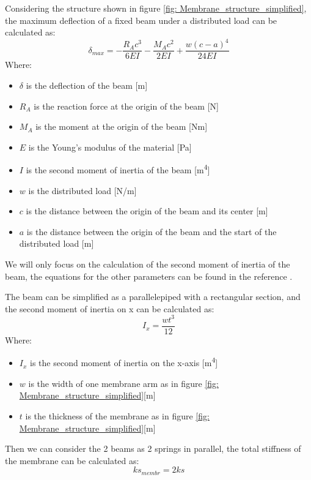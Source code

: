 Considering the structure shown in figure \ref{fig: Membrane_structure_simplified}, the maximum deflection of a fixed beam under a distributed load can be calculated as:
\begin{equation}
    \label{eq: Beam_deflection}
    \delta_{max} = -\frac{R_A c^3}{6 E I} - \frac{M_A c^2}{2EI} + \frac{w (c-a)^4}{24 EI}
\end{equation}
Where:
\begin{itemize}
    \item $\delta$ is the deflection of the beam [m]
    \item $R_A$ is the reaction force at the origin of the beam [N]
    \item $M_A$ is the moment at the origin of the beam [Nm]
    \item $E$ is the Young's modulus of the material [Pa]
    \item $I$ is the second moment of inertia of the beam [m\textsuperscript{4}]
    \item $w$ is the distributed load [N/m]
    \item $c$ is the distance between the origin of the beam and its center [m]
    \item $a$ is the distance between the origin of the beam and the start of the distributed load [m]
\end{itemize}
We will only focus on the calculation of the second moment of inertia of the beam, the equations for the other parameters can be found in the reference \cite{statics_fixed_beam}.

The beam can be simplified as a parallelepiped with a rectangular section, and the second moment of inertia on x can be calculated as:
\begin{equation}
    \label{eq: Beam_inertia}
    I_x = \frac{w t^3}{12}
\end{equation}
Where:
\begin{itemize}
    \item $I_x$ is the second moment of inertia on the x-axis [m\textsuperscript{4}]
    \item $w$ is the width of one membrane arm as in figure \ref{fig: Membrane_structure_simplified}[m]
    \item $t$ is the thickness of the membrane as in figure \ref{fig: Membrane_structure_simplified}[m]
\end{itemize}

Then we can consider the 2 beams as 2 springs in parallel, the total stiffness of the membrane can be calculated as:
\begin{equation}
    ks_{membr} = 2 ks
\end{equation}



